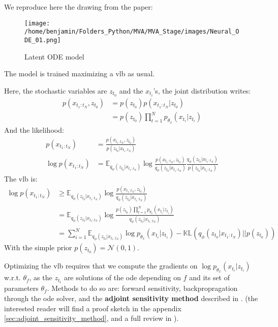 We reproduce here the drawing from the paper:

\begin{figure}[H]
    \centering
    \texttt{[image: /home/benjamin/Folders\_Python/MVA/MVA\_Stage/images/Neural\_ODE\_01.png]}
    \caption{Latent ODE model}
    \label{fig:Latent ODE model}
\end{figure}

The model is trained maximizing a \gls{vlb} as usual. 

Here, the stochastic variables are $z_{t_0}$ and the $x_{t_i}$'s, the joint distribution writes:
\begin{align}
    p(x_{t_1:t_N}, z_{t_0}) &= p(z_{t_0})p(x_{t_1:t_N} \vert z_{t_0}) \\
    &= p(z_{t_0}) \prod_{t=1}^{N}p_{\theta_x}(x_{t_i} \vert z_{t_i})
\end{align}
And the likelihood:
\begin{align}
    p(x_{t_1:t_N}) &= \frac{p(x_{t_1:t_N}, z_{t_0})}{p(z_{t_0} \vert x_{t_1:t_N})} \\
    \log{p(x_{t_1:t_N})} &= \mathbb{E}_{q_{\phi}(z_{t_0} \vert x_{t_1:t_N})} \log{\frac{p(x_{t_1:t_N}, z_{t_0})}{q_{\phi}(z_{t_0}\vert x_{t_1:t_N})}\frac{q_{\phi}(z_{t_0}\vert x_{t_1:t_N})}{p(z_{t_0} \vert x_{t_1:t_N})}}
\end{align}
The \gls{vlb} is:
\begin{align}
    \log{p(x_{t_1:t_N})} &\geq \mathbb{E}_{q_{\phi}(z_{t_0} \vert x_{t_1:t_N})} \log{\frac{p(x_{t_1:t_N}, z_{t_0})}{q_{\phi}(z_{t_0}\vert x_{t_1:t_N})}} \\
    &= \mathbb{E}_{q_{\phi}(z_{t_0} \vert x_{t_1:t_N})} \log{\frac{p(z_{t_0}) \prod_{t=1}^{N}p_{\theta_x}(x_{t_i} \vert z_{t_i})}{q_{\phi}(z_{t_0}\vert x_{t_1:t_N})}} \\
    &= \sum_{i=1}^{N} \mathbb{E}_{q_{\phi}(z_{t_0} \vert x_{t_1:t_N})} \log{p_{\theta_x}(x_{t_i} \vert z_{t_i})} - \mathbb{KL}(q_{\phi}(z_{t_0} \vert x_{t_1:t_N}) \vert\vert p(z_{t_0}))
\end{align}
With the simple prior $p(z_{t_0}) = \mathcal{N}(0,1)$.

Optimizing the \gls{vlb} requires that we compute the gradients on $\log{p_{\theta_x}(x_{t_i} \vert z_{t_i})}$ w.r.t. $\theta_f$, as the $z_{t_i}$ are solutions of the \gls{ode} depending 
on $f$ and its set of parameters $\theta_f$. Methods to do so are: forward sensitivity, backpropragation through the \gls{ode} solver,
and the \textbf{adjoint sensitivity method} described in \cite{pontriagin_mathematical_2018}. 
(the interested reader will find a proof sketch in the appendix \ref{sec:adjoint_sensitivity_method}, 
and a full review in \cite{sengupta_efficient_2014}).

